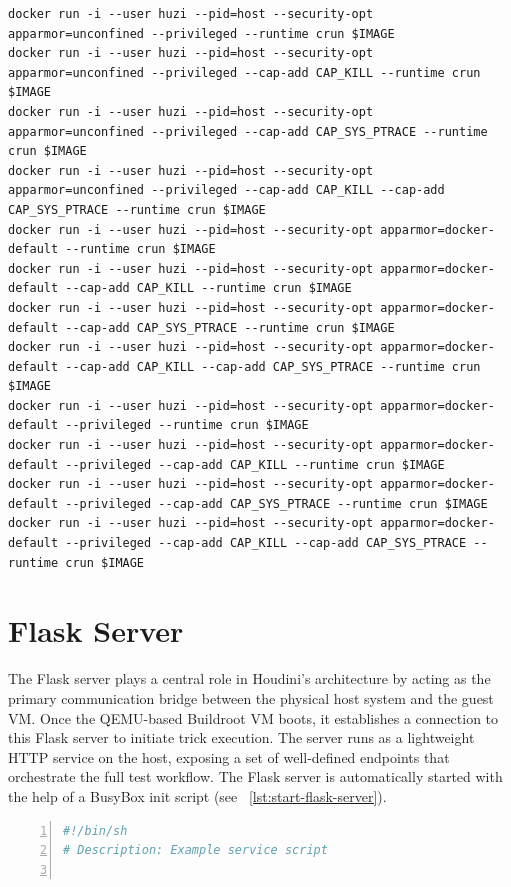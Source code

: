 \documentclass[12pt]{report}
\begin{document}
\begin{doublespace}
\begin{lstlisting}
docker run -i --user huzi --pid=host --security-opt apparmor=unconfined --privileged --runtime crun $IMAGE
docker run -i --user huzi --pid=host --security-opt apparmor=unconfined --privileged --cap-add CAP_KILL --runtime crun $IMAGE
docker run -i --user huzi --pid=host --security-opt apparmor=unconfined --privileged --cap-add CAP_SYS_PTRACE --runtime crun $IMAGE
docker run -i --user huzi --pid=host --security-opt apparmor=unconfined --privileged --cap-add CAP_KILL --cap-add CAP_SYS_PTRACE --runtime crun $IMAGE
docker run -i --user huzi --pid=host --security-opt apparmor=docker-default --runtime crun $IMAGE
docker run -i --user huzi --pid=host --security-opt apparmor=docker-default --cap-add CAP_KILL --runtime crun $IMAGE
docker run -i --user huzi --pid=host --security-opt apparmor=docker-default --cap-add CAP_SYS_PTRACE --runtime crun $IMAGE
docker run -i --user huzi --pid=host --security-opt apparmor=docker-default --cap-add CAP_KILL --cap-add CAP_SYS_PTRACE --runtime crun $IMAGE
docker run -i --user huzi --pid=host --security-opt apparmor=docker-default --privileged --runtime crun $IMAGE
docker run -i --user huzi --pid=host --security-opt apparmor=docker-default --privileged --cap-add CAP_KILL --runtime crun $IMAGE
docker run -i --user huzi --pid=host --security-opt apparmor=docker-default --privileged --cap-add CAP_SYS_PTRACE --runtime crun $IMAGE
docker run -i --user huzi --pid=host --security-opt apparmor=docker-default --privileged --cap-add CAP_KILL --cap-add CAP_SYS_PTRACE --runtime crun $IMAGE
\end{lstlisting}





\section{Flask Server}

The Flask server plays a central role in Houdini’s architecture by acting as the primary communication bridge between the physical host system and the guest VM. Once the QEMU-based Buildroot VM boots, it establishes a connection to this Flask server to initiate trick execution. The server runs as a lightweight HTTP service on the host, exposing a set of well-defined endpoints that orchestrate the full test workflow. The Flask server is automatically started with the help of a BusyBox init script (see ~\ref{lst:start-flask-server}).

\begin{lstlisting}[language=python, caption={BusyBox init file that starts the Flask server}, label={lst:start-flask-server}, numbers=left, numberstyle=\tiny, stepnumber=1, breaklines=true, frame=single, backgroundcolor=\color{gray!10}, basicstyle=\ttfamily\footnotesize, showspaces=false, showstringspaces=false]
#!/bin/sh
# Description: Example service script


\end{lstlisting}
\end{doublespace}
\end{document}
